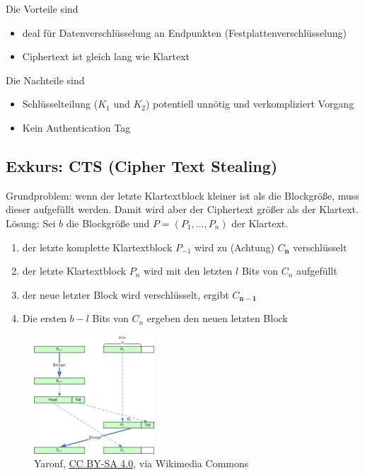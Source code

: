 Die Vorteile sind 

\begin{itemize}
    \item deal für Datenverschlüsselung an Endpunkten (Festplattenverschlüsselung)
    \item Ciphertext ist gleich lang wie Klartext
\end{itemize}

Die Nachteile sind

\begin{itemize}
    \item Schlüsselteilung ($K_1$ und $K_2$) potentiell unnötig und verkompliziert Vorgang
    \item Kein Authentication Tag
\end{itemize}

\subsection{Exkurs: CTS (Cipher Text Stealing)}

Grundproblem: wenn der letzte Klartextblock kleiner ist als die Blockgröße, muss dieser aufgefüllt werden. Damit wird aber der Ciphertext größer als der Klartext. \\

Lösung: Sei $b$ die Blockgröße und $P = (P_1, \ldots, P_n)$ der Klartext.

\begin{enumerate}
    \item der letzte komplette Klartextblock $P_{-1}$ wird zu (Achtung) $C_\mathbf{n}$ verschlüsselt 
    \item der letzte Klartextblock $P_n$ wird mit den letzten $l$ Bits von $C_n$ aufgefüllt
    \item der neue letzter Block wird verschlüsselt, ergibt $C_\mathbf{n-1}$
    \item Die ersten $b-l$ Bits von $C_n$ ergeben den neuen letzten Block
\end{enumerate}

\begin{figure}[h]
    \includegraphics[width=0.4\textwidth]{figures/fig3-CTS_ECB_Encryption}
    \centering
    \caption{Yaronf, \href{https://creativecommons.org/licenses/by-sa/4.0}{CC BY-SA 4.0}, via Wikimedia Commons}
\end{figure}


